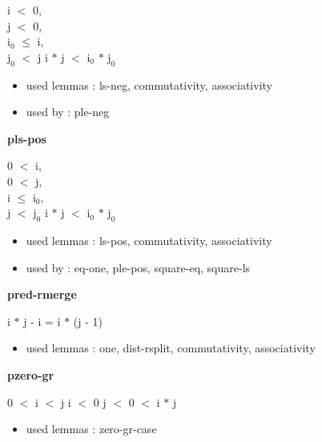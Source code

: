 \documentclass[a4paper]{article}
\begin{document}
i $<$ 0, \\
j $<$ 0, \\
$\mbox{i}_{0}$ $\le$ i, \\
$\mbox{j}_{0}$ $<$ j \Fol i $*$ j $<$ $\mbox{i}_{0}$ $*$ $\mbox{j}_{0}$

\begin{itemize}


\item       used lemmas  : ls-neg, commutativity, associativity
\item       used by      : ple-neg

\end{itemize}

\medskip

\bigskip

{\large\bf pls-pos}

\medskip

0 $<$ i, \\
0 $<$ j, \\
i $\le$ $\mbox{i}_{0}$, \\
j $<$ $\mbox{j}_{0}$ \Fol i $*$ j $<$ $\mbox{i}_{0}$ $*$ $\mbox{j}_{0}$

\begin{itemize}


\item       used lemmas  : ls-pos, commutativity, associativity
\item       used by      : eq-one, ple-pos, square-eq, square-ls

\end{itemize}

\medskip

\bigskip

{\large\bf pred-rmerge}

\medskip

 \Fol i $*$ j - i = i $*$ (j - 1)

\begin{itemize}


\item       used lemmas  : one, dist-rsplit, commutativity, associativity

\end{itemize}

\medskip

\bigskip

{\large\bf pzero-gr}

\medskip

0 $<$ i  $<$ j \Or i $<$ 0 \And j $<$ 0  $<$ i $*$ j

\begin{itemize}


\item       used lemmas  : zero-gr-case

\end{itemize}
\end{document}
